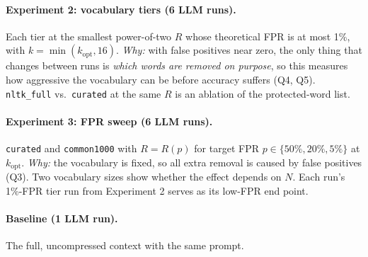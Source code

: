 \documentclass[11pt]{article}
\newcommand{\code}[1]{\texttt{#1}}
\begin{document}
\paragraph{Experiment 2: vocabulary tiers (6 LLM runs).}
Each tier at the smallest power-of-two $R$ whose theoretical FPR is at most 1\%, with
$k=\min(k_{\mathrm{opt}},16)$. \emph{Why:} with false positives near zero, the only thing that
changes between runs is \emph{which words are removed on purpose}, so this measures how aggressive
the vocabulary can be before accuracy suffers (Q4, Q5). \code{nltk\_full} vs.\ \code{curated} at the
same $R$ is an ablation of the protected-word list.

\paragraph{Experiment 3: FPR sweep (6 LLM runs).}
\code{curated} and \code{common1000} with $R = R(p)$ for target FPR $p\in\{50\%, 20\%, 5\%\}$ at
$k_{\mathrm{opt}}$. \emph{Why:} the vocabulary is fixed, so all extra removal is caused by false
positives (Q3). Two vocabulary sizes show whether the effect depends on $N$. Each run's 1\%-FPR tier
run from Experiment 2 serves as its low-FPR end point.

\paragraph{Baseline (1 LLM run).} The full, uncompressed context with the same prompt.
\end{document}
